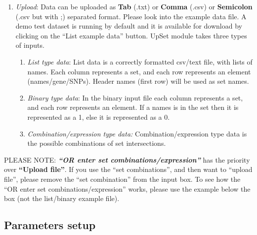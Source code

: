 \documentclass[
  a4paper,
  DIV=11,
  numbers=noendperiod,
  oneside,
  open=any]{scrreport}
\providecommand{\tightlist}{%
  \setlength{\itemsep}{0pt}\setlength{\parskip}{0pt}}\usepackage{longtable,booktabs,array}
\begin{document}
\begin{enumerate}
\def\labelenumi{\arabic{enumi}.}
\item
  \emph{Upload}: Data can be uploaded as \textbf{Tab} (.txt) or
  \textbf{Comma} (.csv) or \textbf{Semicolon} (.csv but with ;)
  separated format. Please look into the example data file. A demo test
  dataset is running by default and it is available for download by
  clicking on the ``List example data'' button. UpSet module takes three
  types of inputs.

  \begin{enumerate}
  \def\labelenumii{\roman{enumii}.}
  \tightlist
  \item
    \emph{List type data}: List data is a correctly formatted csv/text
    file, with lists of names. Each column represents a set, and each
    row represents an element (names/gene/SNPs). Header names (first
    row) will be used as set names.
  \item
    \emph{Binary type data}: In the binary input file each column
    represents a set, and each row represents an element. If a names is
    in the set then it is represented as a 1, else it is represented as
    a 0.
  \item
    \emph{Combination/expression type data:} Combination/expression type
    data is the possible combinations of set intersections.
  \end{enumerate}
\end{enumerate}

\begin{tcolorbox}[enhanced jigsaw, opacityback=0, toprule=.15mm, bottomtitle=1mm, colback=white, rightrule=.15mm, breakable, coltitle=black, colbacktitle=quarto-callout-note-color!10!white, toptitle=1mm, arc=.35mm, colframe=quarto-callout-note-color-frame, bottomrule=.15mm, opacitybacktitle=0.6, titlerule=0mm, leftrule=.75mm, title=\textcolor{quarto-callout-note-color}{\faInfo}\hspace{0.5em}{Note}, left=2mm]

PLEASE NOTE: \textbf{\emph{``OR enter set combinations/expression''}}
has the priority over \textbf{``Upload file''}. If you use the ``set
combinations'', and then want to ``upload file'', please remove the
``set combination'' from the input box. To see how the ``OR enter set
combinations/expression'' works, please use the example below the box
(not the list/binary example file).

\end{tcolorbox}

\subsection{Parameters setup}\label{parameters-setup-4}
\end{document}
